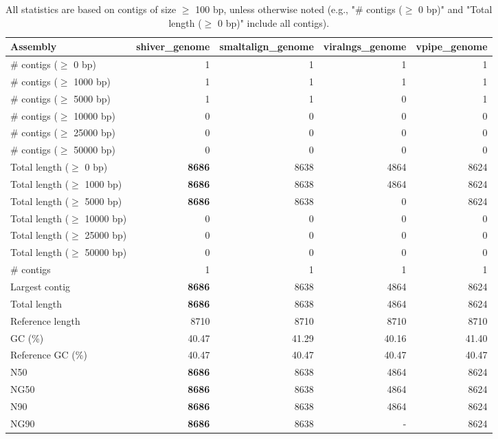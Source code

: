 \documentclass[12pt,a4paper]{article}
\begin{document}
\begin{table}[ht]
\begin{center}
\caption{All statistics are based on contigs of size $\geq$ 100 bp, unless otherwise noted (e.g., "\# contigs ($\geq$ 0 bp)" and "Total length ($\geq$ 0 bp)" include all contigs).}
\begin{tabular}{|l*{4}{|r}|}
\hline
Assembly & shiver\_genome & smaltalign\_genome & viralngs\_genome & vpipe\_genome \\ \hline
\# contigs ($\geq$ 0 bp) & 1 & 1 & 1 & 1 \\ \hline
\# contigs ($\geq$ 1000 bp) & 1 & 1 & 1 & 1 \\ \hline
\# contigs ($\geq$ 5000 bp) & 1 & 1 & 0 & 1 \\ \hline
\# contigs ($\geq$ 10000 bp) & 0 & 0 & 0 & 0 \\ \hline
\# contigs ($\geq$ 25000 bp) & 0 & 0 & 0 & 0 \\ \hline
\# contigs ($\geq$ 50000 bp) & 0 & 0 & 0 & 0 \\ \hline
Total length ($\geq$ 0 bp) & {\bf 8686} & 8638 & 4864 & 8624 \\ \hline
Total length ($\geq$ 1000 bp) & {\bf 8686} & 8638 & 4864 & 8624 \\ \hline
Total length ($\geq$ 5000 bp) & {\bf 8686} & 8638 & 0 & 8624 \\ \hline
Total length ($\geq$ 10000 bp) & 0 & 0 & 0 & 0 \\ \hline
Total length ($\geq$ 25000 bp) & 0 & 0 & 0 & 0 \\ \hline
Total length ($\geq$ 50000 bp) & 0 & 0 & 0 & 0 \\ \hline
\# contigs & 1 & 1 & 1 & 1 \\ \hline
Largest contig & {\bf 8686} & 8638 & 4864 & 8624 \\ \hline
Total length & {\bf 8686} & 8638 & 4864 & 8624 \\ \hline
Reference length & 8710 & 8710 & 8710 & 8710 \\ \hline
GC (\%) & 40.47 & 41.29 & 40.16 & 41.40 \\ \hline
Reference GC (\%) & 40.47 & 40.47 & 40.47 & 40.47 \\ \hline
N50 & {\bf 8686} & 8638 & 4864 & 8624 \\ \hline
NG50 & {\bf 8686} & 8638 & 4864 & 8624 \\ \hline
N90 & {\bf 8686} & 8638 & 4864 & 8624 \\ \hline
NG90 & {\bf 8686} & 8638 & - & 8624 \\ \hline

\end{tabular}
\end{center}
\end{table}
\end{document}
